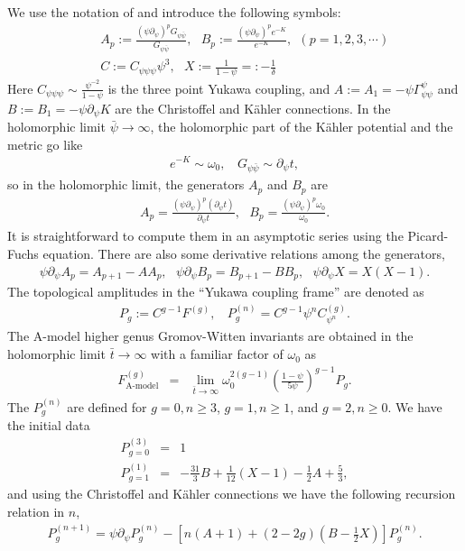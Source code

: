 \documentclass[12pt]{article}
\begin{document}
We use the notation of \cite{Yamaguchi} and introduce the following symbols:
\begin{eqnarray}
&&
A_p:=\frac{(\psi\partial_{\psi})^pG_{\psi\bar{\psi}}}{G_{\psi\bar{\psi}}},
~~~B_p:=\frac{(\psi\partial_{\psi})^pe^{-K}}{e^{-K}}, ~~(p=1,2,3,\cdots) \nonumber \\
&& C:=C_{\psi\psi\psi}\psi^3, ~~~ X:=\frac{1}{1-\psi}=:-\frac{1}{\delta}
\label{generators}
\end{eqnarray}
Here $C_{\psi\psi\psi}\sim \frac{\psi^{-2}}{1-\psi}$ is the three
point Yukawa coupling, and $A:=A_1=-\psi\Gamma_{\psi\psi}^{\psi}$
and $B:=B_1=-\psi\partial_\psi K$ are the Christoffel and K\"ahler
connections. In the holomorphic limit $\bar{\psi}\rightarrow
\infty$, the holomorphic part of the K\"ahler potential and the
metric go like
\begin{eqnarray}
e^{-K}\sim \omega_0, ~~~~G_{\psi\bar{\psi}}\sim \partial_\psi t,
\end{eqnarray}
so in the holomorphic limit, the generators $A_p$ and $B_p$ are
\begin{eqnarray}
A_p=\frac{(\psi\partial_{\psi})^p(\partial_\psi t)}{\partial_\psi
t}, ~~~B_p=\frac{(\psi\partial_{\psi})^p \omega_0}{ \omega_0}.
\end{eqnarray}
It is straightforward to compute them in an asymptotic series
using the Picard-Fuchs equation. There are also some derivative
relations among the generators,
\begin{eqnarray}
\psi\partial_\psi A_p=A_{p+1}-AA_p, ~~~ \psi\partial_\psi
B_p=B_{p+1}-BB_p,~~~ \psi\partial_\psi X=X(X-1). \nonumber
\end{eqnarray}
The topological amplitudes in the ``Yukawa coupling frame'' are
denoted as
\begin{eqnarray}
P_g:=C^{g-1}F^{(g)}, ~~~~
P^{(n)}_g=C^{g-1}\psi^{n}C_{\psi^n}^{(g)}.
\label{defPg}
\end{eqnarray}
The A-model higher genus Gromov-Witten invariants are obtained in
the holomorphic limit $\bar{t}\rightarrow \infty$ with a familiar
factor of $\omega_0$ as
\begin{eqnarray} \label{10-14-2.8}
F^{(g)}_{\textrm{A-model}} &=& \lim_{\bar{t}\rightarrow \infty}
\omega_0^{2(g-1)}(\frac{1-\psi}{5\psi})^{g-1}P_g.
\end{eqnarray}
The $P^{(n)}_g$ are defined for $g=0, n\geq 3$, $g=1, n\geq 1$,
and $g=2, n\geq 0$. We have the initial data
\begin{eqnarray}
P^{(3)}_{g=0}&=&1 \nonumber \\
P^{(1)}_{g=1} &=&
-\frac{31}{3}B+\frac{1}{12}(X-1)-\frac{1}{2}A+\frac{5}{3}
\label{Pg01},
\end{eqnarray}
and using the Christoffel and K\"ahler connections we have the
following recursion relation in $n$,
\begin{eqnarray}
P^{(n+1)}_g=\psi\partial_\psi
P^{(n)}_g-[n(A+1)+(2-2g)(B-\frac{1}{2}X)]P^{(n)}_g.
\end{eqnarray}
\end{document}
